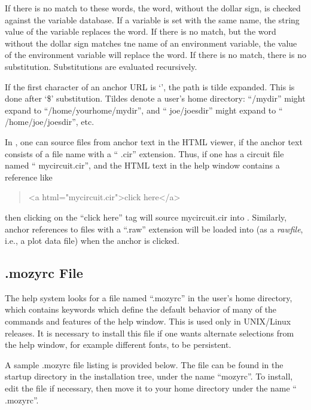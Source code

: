 If there is no match to these words, the word, without the dollar
sign, is checked against the variable database.  If a variable is set
with the same name, the string value of the variable replaces the
word.  If there is no match, but the word without the dollar sign
matches tne name of an environment variable, the value of the
environment variable will replace the word.  If there is no match,
there is no substitution.  Substitutions are evaluated recursively.

If the first character of an anchor URL is `{\vt {}}', the
path is tilde expanded.  This is done after `{\vt \$}' substitution. 
Tildes denote a user's home directory:  ``{\vt {}/mydir}''
might expand to ``{\vt /home/yourhome/mydir}'', and ``{\vt
{}joe/joesdir}'' might expand to ``{\vt
/home/joe/joesdir}'', etc.

In {\WRspice}, one can source files from anchor text in the HTML
viewer, if the anchor text consists of a file name with a ``{\vt
.cir}'' extension.  Thus, if one has a circuit file named ``{\vt
mycircuit.cir}'', and the HTML text in the help window contains a
reference like
\begin{quote}
{\vt <a html="mycircuit.cir">click here</a>}
\end{quote}
then clicking on the ``click here'' tag will source {\vt
mycircuit.cir} into {\WRspice}.  Similarly, anchor references to files
with a ``{\vt .raw}'' extension will be loaded into {\WRspice} (as a
{\it rawfile\/}, i.e., a plot data file) when the anchor is clicked.

\subsection{{\vt .mozyrc} File}
\label{mozyrc}


The help system looks for a file named ``{\vt .mozyrc}'' in the user's
home directory, which contains keywords which define the default
behavior of many of the commands and features of the help window. 
This is used only in UNIX/Linux releases.  It is necessary to install
this file if one wants alternate selections from the help window, for
example different fonts, to be persistent.

A sample {\vt .mozyrc} file listing is provided below.  The file can
be found in the {\vt startup} directory in the installation tree,
under the name ``{\vt mozyrc}''.  To install, edit the file if
necessary, then move it to your home directory under the name ``{\vt
.mozyrc}''.

